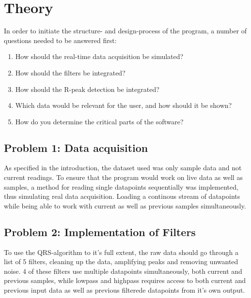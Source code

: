 \documentclass[12pt,a4paper]{article}
\begin{document}
\section{Theory}
 	In order to initiate the structure- and design-process of the program, a number of questions needed to be answered first:\\
 	
 	\begin{enumerate}
	\item How should the real-time data acquisition be simulated?
	\item How should the filters be integrated?
	\item How should the R-peak detection be integrated?
	\item Which data would be relevant for the user, and how should it be shown?
	\item How do you determine the critical parts of the software?
\end{enumerate}

\subsection{Problem 1: Data acquisition}
	As specified in the introduction, the dataset used was only sample data and not current readings. To ensure that the program would work on live data as well as samples, a method for reading single datapoints sequentially was implemented, thus simulating real data acquisition. Loading a continous stream of datapoints while being able to work with current as well as previous samples simultaneously.\\
	
\subsection{Problem 2: Implementation of Filters}
	To use the QRS-algorithm to it's full extent, the raw data should go through a list of 5 filters, cleaning up the data, amplifying peaks and removing unwanted noise. 4 of these filters use multiple datapoints simultaneously, both current and previous samples, while lowpass and highpass requires access to both current and previous input data as well as previous filterede datapoints from it's own output. 
\\
\end{document}
